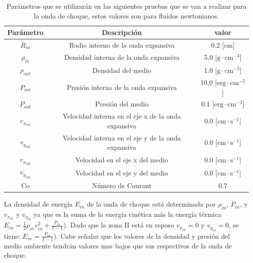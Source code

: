 \documentclass[12pt,a4paper]{book}
\begin{document}
\begin{table}[htbp]
\begin{center}
\begin{tabular}{|c|c|c|}
\hline 
\textbf{Parámetro} & \textbf{Descripción} & \textbf{valor} \\ 
\hline 
$R_{in}$ & Radio interno de la onda expansiva & 0.2 [cm] \\ 
\hline 
$\rho_{in}$ &  Densidad interna de la onda expansiva & 5.0 [$\mathrm{g} \cdot \mathrm{cm}^{-3}$] \\ 
\hline 
$\rho_{out}$ &  Densidad del medio  & 1.0 [$\mathrm{g} \cdot \mathrm{cm}^{-3}$] \\
\hline 
$P_{int}$ & Presión interna de la onda expansiva & 10.0 [$ \mathrm{erg}\cdot \mathrm{cm}^{-2}$]\\ 
\hline 
$P_{out}$ &  Presión del medio  & 0.1 [$\mathrm{erg}\cdot \mathrm{cm}^{-2}$] \\ 
\hline 
$v_{x_{int}}$ & Velocidad interna en el eje x de la onda expansiva & 0.0 [$\mathrm{cm}\cdot \mathrm{s}^{-1}$]\\ 
\hline 
$v_{y_{int}}$ & Velocidad interna en el eje y de la onda expansiva & 0.0 [$\mathrm{cm}\cdot \mathrm{s}^{-1}$]\\ 
\hline 
$v_{x_{out}}$ & Velocidad en el eje x del medio & 0.0 [$\mathrm{cm}\cdot \mathrm{s}^{-1}$] \\
\hline 
$v_{y_{out}}$ & Velocidad en el eje y del medio & 0.0 [$\mathrm{cm}\cdot \mathrm{s}^{-1}$]\\ 
\hline 
Co & Número de Courant & 0.7 \\ 
\hline 
\end{tabular}
\caption{\label{Tabla_parametros}Parámetros que se utilizarán en las siguientes pruebas que se van a realizar para la onda de choque, estos valores son para fluidos newtonianos.}
\end{center}
\end{table}

La densidad de energía $E_{in}$ de la onda de choque está determinada por $\rho_{in}$, $P_{in}$, y $v_{x_{in}}$ y $v_{y_{in}}$ ya que es la suma de la energía cinética más la energía térmica
$E_{in} = {\frac{1}{2}} \rho_{in} v_{in}^2 + {\frac{P_{in}}{\Gamma -1 }}$).
Dado que la zona II está en reposo $v_{x_{in}}=0$ y $v_{y_{in}}=0$, se tiene:
$E_{in} = {\frac{P_{in}}{\Gamma -1 }}$).
Cabe señalar que los valores de la densidad y presión del medio ambiente tendrán valores mas bajos que sus respectivos de la onda de choque. 
\end{document}
